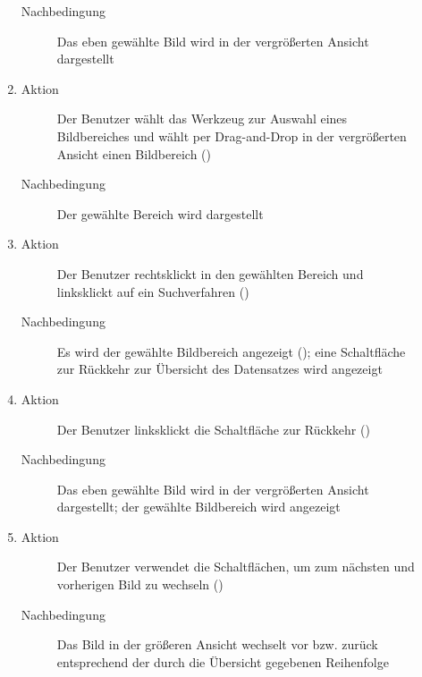 \begin{description}
\begin{enumerate}
\begin{description}
			\item[Nachbedingung] Das eben gewählte Bild wird in der vergrößerten Ansicht dargestellt
		\end{description}
		\item
		\begin{description}
			\item[Aktion] Der Benutzer wählt das Werkzeug zur Auswahl eines Bildbereiches und wählt per Drag-and-Drop in der vergrößerten Ansicht einen Bildbereich ()
			\item[Nachbedingung] Der gewählte Bereich wird dargestellt
		\end{description}
		\item
		\begin{description}
			\item[Aktion] Der Benutzer rechtsklickt in den gewählten Bereich und linksklickt auf ein Suchverfahren ()
			\item[Nachbedingung] Es wird der gewählte Bildbereich angezeigt (); eine Schaltfläche zur Rückkehr zur Übersicht des Datensatzes wird angezeigt
		\end{description}
		\item
		\begin{description}
			\item[Aktion] Der Benutzer linksklickt die Schaltfläche zur Rückkehr ()
			\item[Nachbedingung] Das eben gewählte Bild wird in der vergrößerten Ansicht dargestellt; der gewählte Bildbereich wird angezeigt
		\end{description}
		\item
		\begin{description}
			\item[Aktion] Der Benutzer verwendet die Schaltflächen, um zum nächsten und vorherigen Bild zu wechseln ()
			\item[Nachbedingung] Das Bild in der größeren Ansicht wechselt vor bzw. zurück entsprechend der durch die Übersicht gegebenen Reihenfolge
		\end{description}
	\end{enumerate}


\end{description}
